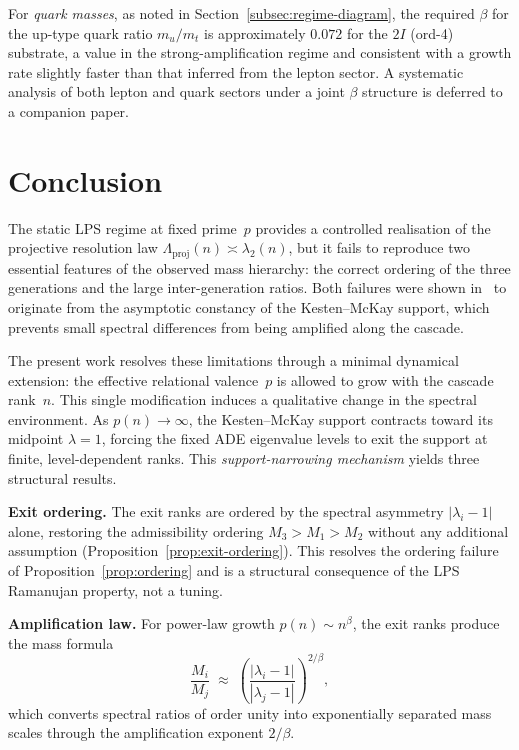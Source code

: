 \documentclass[11pt,a4paper]{article}
\newcommand{\Lproj}{\Lambda_{\mathrm{proj}}}
\newcommand{\ltwo}{\lambda_{2}}
\begin{document}
      For \emph{quark masses}, as noted in Section~\ref{subsec:regime-diagram},
      the required $\beta$ for the up-type quark ratio $m_u/m_t$
      is approximately $0.072$ for the $2I$ (ord-4) substrate,
      a value in the strong-amplification regime
      and consistent with a growth rate slightly faster than
      that inferred from the lepton sector.
      A systematic analysis of both lepton and quark sectors
      under a joint $\beta$ structure is deferred to a companion paper.

  \section{Conclusion}
    \label{sec:conclusion}


    The static LPS regime at fixed prime~$p$ provides a controlled realisation
    of the projective resolution law $\Lproj(n)\asymp\ltwo(n)$,
    but it fails to reproduce two essential features of the observed mass hierarchy:
    the correct ordering of the three generations and the large inter-generation ratios.
    Both failures were shown in~\cite{Beau2026a5} to originate from
    the asymptotic constancy of the Kesten--McKay support,
    which prevents small spectral differences from being amplified along the cascade.

    The present work resolves these limitations through a minimal dynamical extension:
    the effective relational valence~$p$ is allowed to grow with the cascade rank~$n$.
    This single modification induces a qualitative change in the spectral environment.
    As $p(n)\to\infty$, the Kesten--McKay support contracts toward its midpoint
    $\lambda = 1$, forcing the fixed ADE eigenvalue levels to exit the support
    at finite, level-dependent ranks.
    This \emph{support-narrowing mechanism} yields three structural results.

    \medskip
    \noindent
    \textbf{Exit ordering.}
    The exit ranks are ordered by the spectral asymmetry $|\lambda_i - 1|$ alone,
    restoring the admissibility ordering $M_3 > M_1 > M_2$ without any
    additional assumption (Proposition~\ref{prop:exit-ordering}).
    This resolves the ordering failure of Proposition~\ref{prop:ordering}
    and is a structural consequence of the LPS Ramanujan property,
    not a tuning.

    \medskip
    \noindent
    \textbf{Amplification law.}
    For power-law growth $p(n)\sim n^{\beta}$, the exit ranks produce the mass formula
    \begin{equation}
      \frac{M_i}{M_j}
      \;\approx\;
      \left(\frac{|\lambda_i - 1|}{|\lambda_j - 1|}\right)^{2/\beta},
    \end{equation}
    which converts spectral ratios of order unity into exponentially separated
    mass scales through the amplification exponent $2/\beta$.
\end{document}

